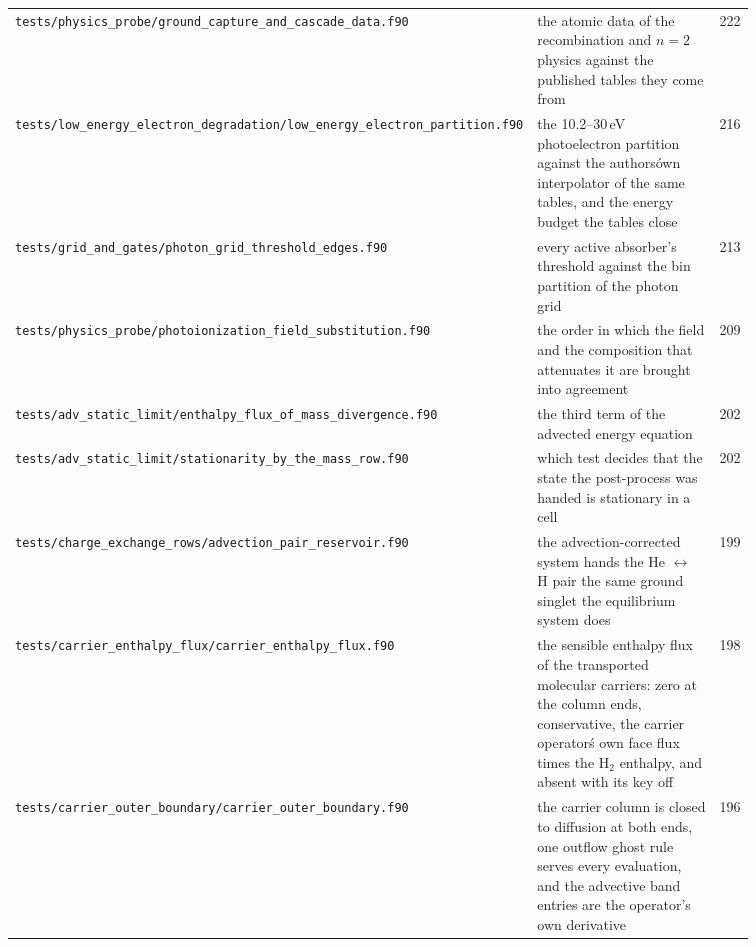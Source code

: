 {\begin{longtable}{@{}>{\raggedright\arraybackslash}p{0.36\linewidth} >{\raggedright\arraybackslash}p{0.50\linewidth} r@{}}
\texttt{tests/\allowbreak physics\_\allowbreak probe/\allowbreak ground\_\allowbreak capture\_\allowbreak and\_\allowbreak cascade\_\allowbreak data.f90} & the atomic data of the recombination and $n{=}2$ physics against the published tables they come from & 222 \\
\texttt{tests/\allowbreak low\_\allowbreak energy\_\allowbreak electron\_\allowbreak degradation/\allowbreak low\_\allowbreak energy\_\allowbreak electron\_\allowbreak partition.f90} & the 10.2--30\,eV photoelectron partition against the authors\' own interpolator of the same tables, and the energy budget the tables close & 216 \\
\texttt{tests/\allowbreak grid\_\allowbreak and\_\allowbreak gates/\allowbreak photon\_\allowbreak grid\_\allowbreak threshold\_\allowbreak edges.f90} & every active absorber's threshold against the bin partition of the photon grid & 213 \\
\texttt{tests/\allowbreak physics\_\allowbreak probe/\allowbreak photoionization\_\allowbreak field\_\allowbreak substitution.f90} & the order in which the field and the composition that attenuates it are brought into agreement & 209 \\
\texttt{tests/\allowbreak adv\_\allowbreak static\_\allowbreak limit/\allowbreak enthalpy\_\allowbreak flux\_\allowbreak of\_\allowbreak mass\_\allowbreak divergence.f90} & the third term of the advected energy equation & 202 \\
\texttt{tests/\allowbreak adv\_\allowbreak static\_\allowbreak limit/\allowbreak stationarity\_\allowbreak by\_\allowbreak the\_\allowbreak mass\_\allowbreak row.f90} & which test decides that the state the post-process was handed is stationary in a cell & 202 \\
\texttt{tests/\allowbreak charge\_\allowbreak exchange\_\allowbreak rows/\allowbreak advection\_\allowbreak pair\_\allowbreak reservoir.f90} & the advection-corrected system hands the He $\leftrightarrow$ H pair the same ground singlet the equilibrium system does & 199 \\
\texttt{tests/\allowbreak carrier\_\allowbreak enthalpy\_\allowbreak flux/\allowbreak carrier\_\allowbreak enthalpy\_\allowbreak flux.f90} & the sensible enthalpy flux of the transported molecular carriers: zero at the column ends, conservative, the carrier operator\'s own face flux times the H$_2$ enthalpy, and absent with its key off & 198 \\
\texttt{tests/\allowbreak carrier\_\allowbreak outer\_\allowbreak boundary/\allowbreak carrier\_\allowbreak outer\_\allowbreak boundary.f90} & the carrier column is closed to diffusion at both ends, one outflow ghost rule serves every evaluation, and the advective band entries are the operator's own derivative & 196 \\

\end{longtable}}
